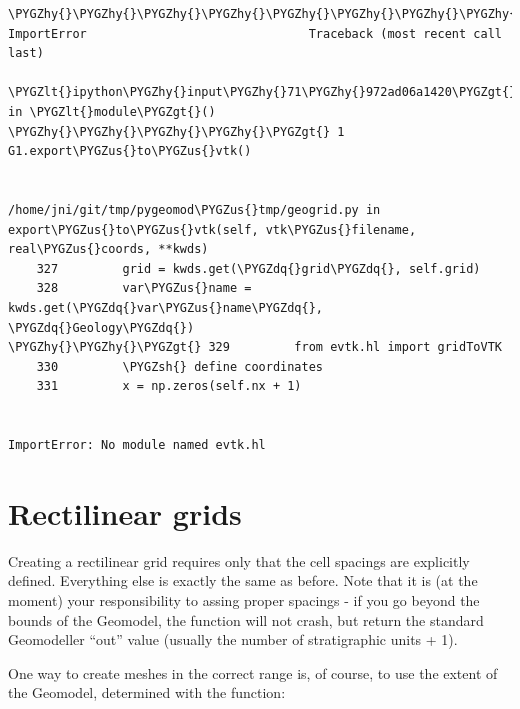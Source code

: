 \documentclass[letterpaper,10pt,english]{sphinxmanual}
\def\PYGZus{\char`\_}
\def\PYGZlt{\char`\<}
\def\PYGZgt{\char`\>}
\def\PYGZsh{\char`\#}
\def\PYGZhy{\char`\-}
\def\PYGZdq{\char`\"}
\begin{document}
\begin{Verbatim}[commandchars=\\\{\}]
\PYGZhy{}\PYGZhy{}\PYGZhy{}\PYGZhy{}\PYGZhy{}\PYGZhy{}\PYGZhy{}\PYGZhy{}\PYGZhy{}\PYGZhy{}\PYGZhy{}\PYGZhy{}\PYGZhy{}\PYGZhy{}\PYGZhy{}\PYGZhy{}\PYGZhy{}\PYGZhy{}\PYGZhy{}\PYGZhy{}\PYGZhy{}\PYGZhy{}\PYGZhy{}\PYGZhy{}\PYGZhy{}\PYGZhy{}\PYGZhy{}\PYGZhy{}\PYGZhy{}\PYGZhy{}\PYGZhy{}\PYGZhy{}\PYGZhy{}\PYGZhy{}\PYGZhy{}\PYGZhy{}\PYGZhy{}\PYGZhy{}\PYGZhy{}\PYGZhy{}\PYGZhy{}\PYGZhy{}\PYGZhy{}\PYGZhy{}\PYGZhy{}\PYGZhy{}\PYGZhy{}\PYGZhy{}\PYGZhy{}\PYGZhy{}\PYGZhy{}\PYGZhy{}\PYGZhy{}\PYGZhy{}\PYGZhy{}\PYGZhy{}\PYGZhy{}\PYGZhy{}\PYGZhy{}\PYGZhy{}\PYGZhy{}\PYGZhy{}\PYGZhy{}\PYGZhy{}\PYGZhy{}\PYGZhy{}\PYGZhy{}\PYGZhy{}\PYGZhy{}\PYGZhy{}\PYGZhy{}\PYGZhy{}\PYGZhy{}\PYGZhy{}\PYGZhy{}
ImportError                               Traceback (most recent call last)

\PYGZlt{}ipython\PYGZhy{}input\PYGZhy{}71\PYGZhy{}972ad06a1420\PYGZgt{} in \PYGZlt{}module\PYGZgt{}()
\PYGZhy{}\PYGZhy{}\PYGZhy{}\PYGZhy{}\PYGZgt{} 1 G1.export\PYGZus{}to\PYGZus{}vtk()


/home/jni/git/tmp/pygeomod\PYGZus{}tmp/geogrid.py in export\PYGZus{}to\PYGZus{}vtk(self, vtk\PYGZus{}filename, real\PYGZus{}coords, **kwds)
    327         grid = kwds.get(\PYGZdq{}grid\PYGZdq{}, self.grid)
    328         var\PYGZus{}name = kwds.get(\PYGZdq{}var\PYGZus{}name\PYGZdq{}, \PYGZdq{}Geology\PYGZdq{})
\PYGZhy{}\PYGZhy{}\PYGZgt{} 329         from evtk.hl import gridToVTK
    330         \PYGZsh{} define coordinates
    331         x = np.zeros(self.nx + 1)


ImportError: No module named evtk.hl
\end{Verbatim}


\section{Rectilinear grids}
\label{Geomodeller-Export:rectilinear-grids}
Creating a rectilinear grid requires only that the cell spacings are
explicitly defined. Everything else is exactly the same as before. Note
that it is (at the moment) your responsibility to assing proper spacings
- if you go beyond the bounds of the Geomodel, the function will not
crash, but return the standard Geomodeller ``out'' value (usually the
number of stratigraphic units + 1).

One way to create meshes in the correct range is, of course, to use the
extent of the Geomodel, determined with the function:
\end{document}
